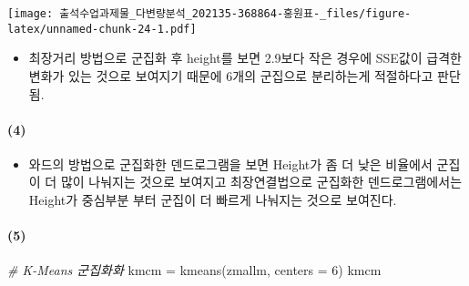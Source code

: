 \documentclass[
]{article}
\newenvironment{Shaded}{\begin{snugshade}}{\end{snugshade}}
\newcommand{\AttributeTok}[1]{\textcolor[rgb]{0.77,0.63,0.00}{#1}}
\newcommand{\CommentTok}[1]{\textcolor[rgb]{0.56,0.35,0.01}{\textit{#1}}}
\newcommand{\DecValTok}[1]{\textcolor[rgb]{0.00,0.00,0.81}{#1}}
\newcommand{\FunctionTok}[1]{\textcolor[rgb]{0.00,0.00,0.00}{#1}}
\newcommand{\NormalTok}[1]{#1}
\newcommand{\OtherTok}[1]{\textcolor[rgb]{0.56,0.35,0.01}{#1}}
\providecommand{\tightlist}{%
  \setlength{\itemsep}{0pt}\setlength{\parskip}{0pt}}
\begin{document}
\texttt{[image: 출석수업과제물\_다변량분석\_202135-368864-홍원표-\_files/figure-latex/unnamed-chunk-24-1.pdf]}

\begin{itemize}
\tightlist
\item
  최장거리 방법으로 군집화 후 height를 보면 2.9보다 작은 경우에 SSE값이
  급격한 변화가 있는 것으로 보여지기 때문에 6개의 군집으로 분리하는게
  적절하다고 판단됨.
\end{itemize}

\hypertarget{section-8}{%
\paragraph{(4)}\label{section-8}}

\begin{itemize}
\tightlist
\item
  와드의 방법으로 군집화한 덴드로그램을 보면 Height가 좀 더 낮은
  비율에서 군집이 더 많이 나눠지는 것으로 보여지고 최장연결법으로
  군집화한 덴드로그램에서는 Height가 중심부분 부터 군집이 더 빠르게
  나눠지는 것으로 보여진다.
\end{itemize}

\hypertarget{section-9}{%
\paragraph{(5)}\label{section-9}}

\begin{Shaded}
\begin{Highlighting}[]
\CommentTok{\# K{-}Means 군집화화}
\NormalTok{kmcm }\OtherTok{=} \FunctionTok{kmeans}\NormalTok{(zmallm, }\AttributeTok{centers =} \DecValTok{6}\NormalTok{)}
\NormalTok{kmcm}
\end{Highlighting}
\end{Shaded}
\end{document}
